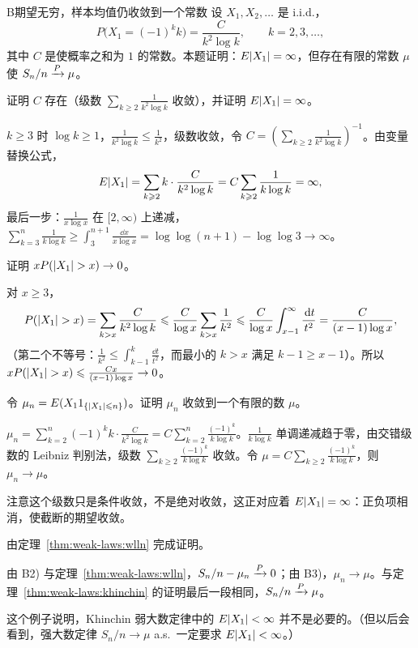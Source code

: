 \begin{probleme}{B}{期望无穷，样本均值仍收敛到一个常数}
设 $X_1,X_2,\dots$ 是 i.i.d.，
\[
P\bigl(X_1=(-1)^kk\bigr)=\frac C{k^2\log k},\qquad k=2,3,\dots,
\]
其中 $C$ 是使概率之和为 $1$ 的常数。本题证明：$E\lvert X_1\rvert=\infty$，但存在有限的常数 $\mu$ 使 $S_n/n\xrightarrow{P}\mu$。
\begin{questions}
\item 证明 $C$ 存在（级数 $\sum_{k\geqslant2}\frac1{k^2\log k}$ 收敛），并证明 $E\lvert X_1\rvert=\infty$。
\begin{solution}
$k\geqslant3$ 时 $\log k\geqslant1$，$\frac1{k^2\log k}\leqslant\frac1{k^2}$，级数收敛，令 $C=(\sum_{k\geqslant2}\frac1{k^2\log k})^{-1}$。由变量替换公式，
\[
E\lvert X_1\rvert=\sum_{k\geqslant2}k\cdot\frac C{k^2\log k}=C\sum_{k\geqslant2}\frac1{k\log k}=\infty,
\]
最后一步：$\frac1{x\log x}$ 在 $[2,\infty)$ 上递减，$\sum_{k=3}^n\frac1{k\log k}\geqslant\int_3^{n+1}\frac{\dd x}{x\log x}=\log\log(n+1)-\log\log3\to\infty$。
\end{solution}
\item 证明 $xP(\lvert X_1\rvert>x)\to0$。
\begin{solution}
对 $x\geqslant3$，
\[
P(\lvert X_1\rvert>x)=\sum_{k>x}\frac C{k^2\log k}\leqslant\frac C{\log x}\sum_{k>x}\frac1{k^2}\leqslant\frac C{\log x}\int_{x-1}^\infty\frac{\,\mathrm{d} t}{t^2}=\frac C{(x-1)\log x},
\]
（第二个不等号：$\frac1{k^2}\leqslant\int_{k-1}^k\frac{\dd t}{t^2}$，而最小的 $k>x$ 满足 $k-1\geqslant x-1$）。所以 $xP(\lvert X_1\rvert>x)\leqslant\frac{Cx}{(x-1)\log x}\to0$。
\end{solution}
\item 令 $\mu_n=E(X_11_{\{\lvert X_1\rvert\leqslant n\}})$。证明 $\mu_n$ 收敛到一个有限的数 $\mu$。
\begin{solution}
$\mu_n=\sum_{k=2}^n(-1)^kk\cdot\frac C{k^2\log k}=C\sum_{k=2}^n\frac{(-1)^k}{k\log k}$。$\frac1{k\log k}$ 单调递减趋于零，由交错级数的 Leibniz 判别法，级数 $\sum_{k\geqslant2}\frac{(-1)^k}{k\log k}$ 收敛。令 $\mu=C\sum_{k\geqslant2}\frac{(-1)^k}{k\log k}$，则 $\mu_n\to\mu$。

注意这个级数只是条件收敛，不是绝对收敛，这正对应着 $E\lvert X_1\rvert=\infty$：正负项相消，使截断的期望收敛。
\end{solution}
\item 由定理~\ref{thm:weak-laws:wlln} 完成证明。
\begin{solution}
由 B2) 与定理~\ref{thm:weak-laws:wlln}，$S_n/n-\mu_n\xrightarrow{P}0$；由 B3)，$\mu_n\to\mu$。与定理~\ref{thm:weak-laws:khinchin} 的证明最后一段相同，$S_n/n\xrightarrow{P}\mu$。

这个例子说明，Khinchin 弱大数定律中的 $E\lvert X_1\rvert<\infty$ 并不是必要的。（但以后会看到，强大数定律 $S_n/n\to\mu$ a.s.\ 一定要求 $E\lvert X_1\rvert<\infty$。）
\end{solution}
\end{questions}
\end{probleme}

